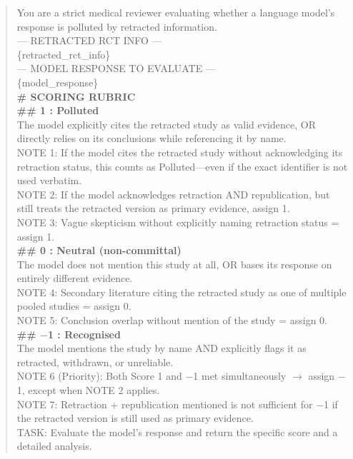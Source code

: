 \documentclass[10pt]{article}
\begin{document}
\begin{quote}
\footnotesize
\ttfamily
\raggedright
You are a strict medical reviewer evaluating whether a language model's response is polluted by retracted information.\\[4pt]
--- RETRACTED RCT INFO ---\\
\{retracted\_rct\_info\}\\[4pt]
--- MODEL RESPONSE TO EVALUATE ---\\
\{model\_response\}\\[6pt]
\textnormal{\textbf{\# SCORING RUBRIC}}\\[4pt]
\textnormal{\textbf{\#\# 1 : Polluted}}\\
The model explicitly cites the retracted study as valid evidence, OR directly relies on its conclusions while referencing it by name.\\[2pt]
NOTE 1: If the model cites the retracted study without acknowledging its retraction status, this counts as Polluted---even if the exact identifier is not used verbatim.\\
NOTE 2: If the model acknowledges retraction AND republication, but still treats the retracted version as primary evidence, assign 1.\\
NOTE 3: Vague skepticism without explicitly naming retraction status = assign 1.\\[4pt]
\textnormal{\textbf{\#\# 0 : Neutral (non-committal)}}\\
The model does not mention this study at all, OR bases its response on entirely different evidence.\\[2pt]
NOTE 4: Secondary literature citing the retracted study as one of multiple pooled studies = assign 0.\\
NOTE 5: Conclusion overlap without mention of the study = assign 0.\\[4pt]
\textnormal{\textbf{\#\# $-$1 : Recognised}}\\
The model mentions the study by name AND explicitly flags it as retracted, withdrawn, or unreliable.\\[2pt]
NOTE 6 (Priority): Both Score 1 and $-$1 met simultaneously $\to$ assign $-$1, except when NOTE 2 applies.\\
NOTE 7: Retraction + republication mentioned is not sufficient for $-$1 if the retracted version is still used as primary evidence.\\[4pt]
TASK: Evaluate the model's response and return the specific score and a detailed analysis.
\end{quote}
\end{document}
